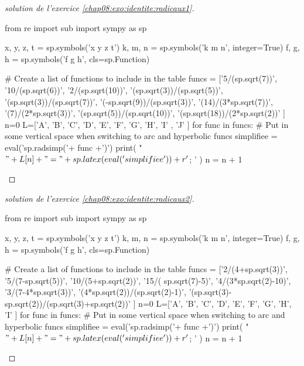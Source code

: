 \documentclass[main.tex]{subfiles}
\begin{document}
\begin{proof}[solution de l'exercice \ref{chap08:exo:identite:radicaux1}]\scriptsize
\begin{pycode}
from re import sub
import sympy as sp

x, y, z, t = sp.symbols('x y z t')
k, m, n = sp.symbols('k m n', integer=True)
f, g, h = sp.symbols('f g h', cls=sp.Function)

# Create a list of functions to include in the table
funcs = ['5/(sp.sqrt(7))',
'10/(sp.sqrt(6))',
'2/(sp.sqrt(10))',
'(sp.sqrt(3))/(sp.sqrt(5))',
'(sp.sqrt(3))/(sp.sqrt(7))',
'(-sp.sqrt(9))/(sp.sqrt(3))',
'(14)/(3*sp.sqrt(7))',
'(7)/(2*sp.sqrt(3))',
'(sp.sqrt(5))/(sp.sqrt(10))',
'(sp.sqrt(18))/(2*sp.sqrt(2))'
]
n=0
L=['A', 'B', 'C', 'D', 'E', 'F', 'G', 'H', 'I' , 'J' ]
for func in funcs:
	# Put in some vertical space when switching to arc and hyperbolic funcs
	simplifiee =  eval('sp.radsimp('+ func +')')
	print( "$"+L[n] + " =" + sp.latex( eval('simplifiee') )  + r'$; ' )
	n     = n + 1
\end{pycode}
\end{proof}	
\begin{proof}[solution de l'exercice \ref{chap08:exo:identite:radicaux2}]\scriptsize
	\begin{pycode}
from re import sub
import sympy as sp

x, y, z, t = sp.symbols('x y z t')
k, m, n = sp.symbols('k m n', integer=True)
f, g, h = sp.symbols('f g h', cls=sp.Function)

# Create a list of functions to include in the table
funcs = ['2/(4+sp.sqrt(3))',
'5/(7-sp.sqrt(5))',
'10/(5+sp.sqrt(2))',
'15/( sp.sqrt(7)-5)',
'4/(3*sp.sqrt(2)-10)',
'3/(7-4*sp.sqrt(3))',
'(4*sp.sqrt(2))/(sp.sqrt(2)-1)',
'(sp.sqrt(3)-sp.sqrt(2))/(sp.sqrt(3)+sp.sqrt(2))' 
]
n=0
L=['A', 'B', 'C', 'D', 'E', 'F', 'G', 'H', 'I'  ]
for func in funcs:
	# Put in some vertical space when switching to arc and hyperbolic funcs
	simplifiee =  eval('sp.radsimp('+ func +')')
	print( "$"+L[n] + " =" + sp.latex( eval('simplifiee') )  + r'$; ' )
	n     = n + 1
\end{pycode}
\end{proof}



\newpage 
{}  
\pagestyle{scrheadings} %
\onehalfspacing
\end{document}
